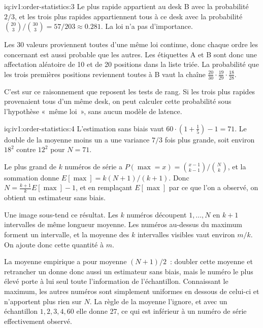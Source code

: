 \begin{solution}{iq:iv1:order-statistics:3}
Le plus rapide appartient au desk B avec la probabilité $2/3$, et les trois plus rapides appartiennent tous à ce desk avec la probabilité $\binom{20}{3}/\binom{30}{3} = 57/203 \approx 0.281$. La loi n'a pas d'importance.

Les 30 valeurs proviennent toutes d'une même loi continue, donc chaque ordre les concernant est aussi probable que les autres. Les étiquettes A et B sont donc une affectation aléatoire de 10 et de 20 positions dans la liste triée. La probabilité que les trois premières positions reviennent toutes à B vaut la chaîne $\tfrac{20}{30} \cdot \tfrac{19}{29} \cdot \tfrac{18}{28}$.

C'est sur ce raisonnement que reposent les tests de rang. Si les trois plus rapides provenaient tous d'un même desk, on peut calculer cette probabilité sous l'hypothèse «~même loi~», sans aucun modèle de latence.

\end{solution}

\begin{solution}{iq:iv1:order-statistics:4}
L'estimation sans biais vaut $60 \cdot (1 + \tfrac15) - 1 = 71$. Le double de la moyenne moins un a une variance $7/3$ fois plus grande, soit environ $18^2$ contre $12^2$ pour $N = 71$.

Le plus grand de $k$ numéros de série a $P(\max = x) = \binom{x - 1}{k - 1}/\binom{N}{k}$, et la sommation donne $E[\max] = k(N + 1)/(k + 1)$. Donc $N = \frac{k + 1}{k} E[\max] - 1$, et en remplaçant $E[\max]$ par ce que l'on a observé, on obtient un estimateur sans biais.

Une image sous-tend ce résultat. Les $k$ numéros découpent $1, \dots, N$ en $k + 1$ intervalles de même longueur moyenne. Les numéros au-dessus du maximum forment un intervalle, et la moyenne des $k$ intervalles visibles vaut environ $m/k$. On ajoute donc cette quantité à $m$.

La moyenne empirique a pour moyenne $(N + 1)/2$~: doubler cette moyenne et retrancher un donne donc aussi un estimateur sans biais, mais le numéro le plus élevé porte à lui seul toute l'information de l'échantillon. Connaissant le maximum, les autres numéros sont simplement uniformes en dessous de celui-ci et n'apportent plus rien sur $N$. La règle de la moyenne l'ignore, et avec un échantillon $1, 2, 3, 4, 60$ elle donne 27, ce qui est inférieur à un numéro de série effectivement observé.

\end{solution}

